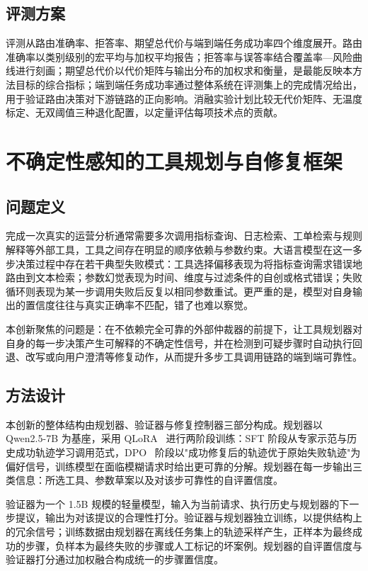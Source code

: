 \subsection{评测方案}

评测从路由准确率、拒答率、期望总代价与端到端任务成功率四个维度展开。路由准确率以类别级别的宏平均与加权平均报告；拒答率与误答率结合覆盖率—风险曲线进行刻画；期望总代价以代价矩阵与输出分布的加权求和衡量，是最能反映本方法目标的综合指标；端到端任务成功率通过整体系统在评测集上的完成情况给出，用于验证路由决策对下游链路的正向影响。消融实验计划比较无代价矩阵、无温度标定、无双阈值三种退化配置，以定量评估每项技术点的贡献。

\section{不确定性感知的工具规划与自修复框架}

\subsection{问题定义}

完成一次真实的运营分析通常需要多次调用指标查询、日志检索、工单检索与规则解释等外部工具，工具之间存在明显的顺序依赖与参数约束。大语言模型在这一多步决策过程中存在若干典型失败模式：工具选择偏移表现为将指标查询需求错误地路由到文本检索；参数幻觉表现为时间、维度与过滤条件的自创或格式错误；失败循环则表现为某一步调用失败后反复以相同参数重试。更严重的是，模型对自身输出的置信度往往与真实正确率不匹配，错了也难以察觉。

本创新聚焦的问题是：在不依赖完全可靠的外部仲裁器的前提下，让工具规划器对自身的每一步决策产生可解释的不确定性信号，并在检测到可疑步骤时自动执行回退、改写或向用户澄清等修复动作，从而提升多步工具调用链路的端到端可靠性。

\subsection{方法设计}

本创新的整体结构由规划器、验证器与修复控制器三部分构成。规划器以 Qwen2.5-7B 为基座，采用 QLoRA~\cite{qlora} 进行两阶段训练：SFT 阶段从专家示范与历史成功轨迹学习调用范式，DPO~\cite{dpo} 阶段以"成功修复后的轨迹优于原始失败轨迹"为偏好信号，训练模型在面临模糊请求时给出更可靠的分解。规划器在每一步输出三类信息：所选工具、参数草案以及对该步可靠性的自评置信度。

验证器为一个 1.5B 规模的轻量模型，输入为当前请求、执行历史与规划器的下一步提议，输出为对该提议的合理性打分。验证器与规划器独立训练，以提供结构上的冗余信号；训练数据由规划器在离线任务集上的轨迹采样产生，正样本为最终成功的步骤，负样本为最终失败的步骤或人工标记的坏案例。规划器的自评置信度与验证器打分通过加权融合构成统一的步骤置信度。

